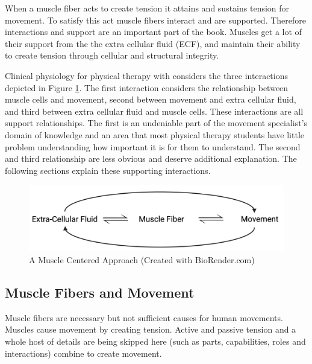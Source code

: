 When a muscle fiber acts to create tension it attains and sustains tension for movement. To satisfy this act muscle fibers interact and are supported. Therefore interactions and support are an important part of the book. Muscles get a lot of their support from the the extra cellular fluid (ECF), and maintain their ability to create tension through cellular and structural integrity.

Clinical physiology for physical therapy with considers the three interactions depicted in Figure \ref{fig:muscle_centered_approach}.  The first interaction considers the relationship between muscle cells and movement, second between movement and extra cellular fluid, and third between extra cellular fluid and muscle cells. These interactions are all support relationships. The first is an undeniable part of the movement specialist’s domain of knowledge and an area that most physical therapy students have little problem understanding how important it is for them to understand. The second and third relationship are less obvious and deserve additional explanation. The following sections explain these supporting interactions.

\begin{figure}[!ht]
    \centering
    \includegraphics[width=1\linewidth]{./figure/muscle_centered_approach.png}
    \caption{A Muscle Centered Approach \footnotesize{(Created with BioRender.com)}}
    \label{fig:muscle_centered_approach}
\end{figure}

\subsection{Muscle Fibers and Movement}

Muscle fibers are necessary but not sufficient causes for human movements. Muscles cause movement by creating tension. Active and passive tension and a whole host of details are being skipped here (such as parts, capabilities, roles and interactions) combine to create movement.

